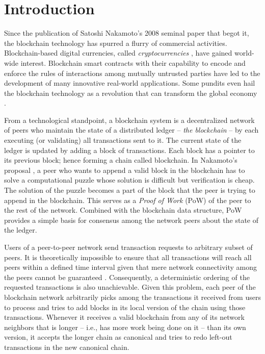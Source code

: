 \section{Introduction}
Since the publication of Satoshi Nakamoto's 2008 seminal paper \cite{bitcoin} that begot it, the blockchain technology has spurred a flurry of commercial activities. Blockchain-based digital currencies, called \textit{cryptocurrencies} \cite{coinMarket} \cite{bitcoin}, have gained world-wide interest. Blockchain smart contracts \cite{Wood2014EthereumAS} \cite{FM548} with their capability to encode and enforce the rules of interactions among mutually untrusted parties have led to the development of many innovative real-world applications. Some pundits even hail the blockchain technology as a revolution that can transform the global economy \cite{blockchainRevolution1}. 

From a technological standpoint, a blockchain system is a decentralized network of peers who maintain the state of a distributed ledger -- \textit{the blockchain} -- by each executing (or validating) all  transactions sent to it. The current state of the ledger is updated by adding a block of transactions. Each block has a pointer to its previous block; hence forming a chain called blockchain. In Nakamoto's proposal \cite{bitcoin}, a peer who wants to append a valid block in the blockchain has to solve a computational puzzle whose solution is difficult but verification is cheap. The solution of the puzzle becomes a part of the block that the peer is trying to append in the blockchain. This serves as a \textit{Proof of Work} (PoW) \cite{Back02hashcash} of the peer to the rest of the network. Combined with the blockchain data structure, PoW provides a simple basis for consensus \cite{Barborak:1993:CPF:152610.152612} among the network peers about the state of the ledger.

Users of a peer-to-peer network send transaction requests to arbitrary subset of peers. It is theoretically impossible to ensure that all transactions will reach all peers within a defined time interval given that mere network connectivity among the peers cannot be guaranteed \cite{Fischer1983TheCP}. Consequently, a deterministic ordering of the requested transactions is also unachievable. Given this problem, each peer of the blockchain network arbitrarily picks among the transactions it received from users to process and tries to add blocks in its local version of the chain using those transactions. Whenever it receives a valid blockchain from any of its network neighbors that is longer -- i.e., has more work being done on it -- than its own version, it accepts the longer chain as canonical and tries to redo left-out transactions in the new canonical chain. 

